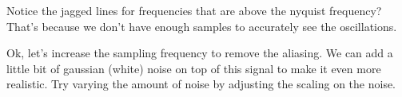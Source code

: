\documentclass[letterpaper,10pt,english]{sphinxmanual}
\begin{document}
\begin{sphinxVerbatim}[commandchars=\\\{\}]
  
 
 
\end{sphinxVerbatim}

\noindent{}

\noindent{}

Notice the jagged lines for frequencies that are above the nyquist frequency? That’s because we don’t have enough samples to accurately see the oscillations.

Ok, let’s increase the sampling frequency to remove the aliasing. We can add a little bit of gaussian (white) noise on top of this signal to make it even more realistic.  Try varying the amount of noise by adjusting the scaling on the noise.
\end{document}
